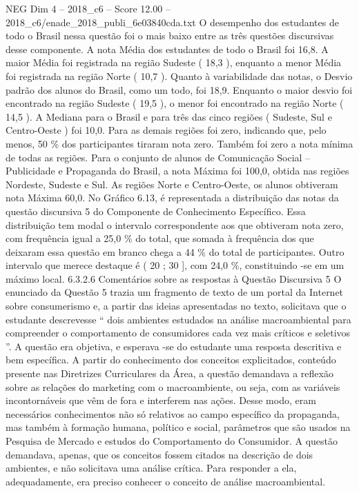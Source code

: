 \begin{textsample}{NEG Dim 4 – 2018\_c6 – Score 12.00 – 2018\_c6/enade\_2018\_publi\_6e03840cda.txt}
O desempenho dos estudantes de todo o Brasil nessa questão foi o mais baixo entre as três questões discursivas desse componente.
A nota Média dos estudantes de todo o Brasil foi 16,8.
A maior Média foi registrada na região Sudeste ( 18,3 ), enquanto a menor Média foi registrada na região Norte ( 10,7 ).
Quanto à variabilidade das notas, o Desvio padrão dos alunos do Brasil, como um todo, foi 18,9.
Enquanto o maior desvio foi encontrado na região Sudeste ( 19,5 ), o menor foi encontrado na região Norte ( 14,5 ).
A Mediana para o Brasil e para três das cinco regiões ( Sudeste, Sul e Centro-Oeste ) foi 10,0.
Para as demais regiões foi zero, indicando que, pelo menos, 50 \% dos participantes tiraram nota zero.
Também foi zero a nota mínima de todas as regiões.
Para o conjunto de alunos de Comunicação Social – Publicidade e Propaganda do Brasil, a nota Máxima foi 100,0, obtida nas regiões Nordeste, Sudeste e Sul.
As regiões Norte e Centro-Oeste, os alunos obtiveram nota Máxima 60,0.
No Gráfico 6.13, é representada a distribuição das notas da questão discursiva 5 do Componente de Conhecimento Específico.
Essa distribuição tem modal o intervalo correspondente aos que obtiveram nota zero, com frequência igual a 25,0 \% do total, que somada à frequência dos que deixaram essa questão em branco chega a 44 \% do total de participantes.
Outro intervalo que merece destaque é ( 20 ; 30 ], com 24,0 \%, constituindo -se em um máximo local. 6.3.2.6 Comentários sobre as respostas à Questão Discursiva 5 O enunciado da Questão 5 trazia um fragmento de texto de um portal da Internet sobre consumerismo e, a partir das ideias apresentadas no texto, solicitava que o estudante descrevesse “ dois ambientes estudados na análise macroambiental para compreender o comportamento de consumidores cada vez mais críticos e seletivos ”.
A questão era objetiva, e esperava -se do estudante uma resposta descritiva e bem específica.
A partir do conhecimento dos conceitos explicitados, conteúdo presente nas Diretrizes Curriculares da Área, a questão demandava a reflexão sobre as relações do marketing com o macroambiente, ou seja, com as variáveis incontornáveis que vêm de fora e interferem nas ações.
Desse modo, eram necessários conhecimentos não só relativos ao campo específico da propaganda, mas também à formação humana, político e social, parâmetros que são usados na Pesquisa de Mercado e estudos do Comportamento do Consumidor.
A questão demandava, apenas, que os conceitos fossem citados na descrição de dois ambientes, e não solicitava uma análise crítica.
Para responder a ela, adequadamente, era preciso conhecer o conceito de análise macroambiental.

\end{textsample}
